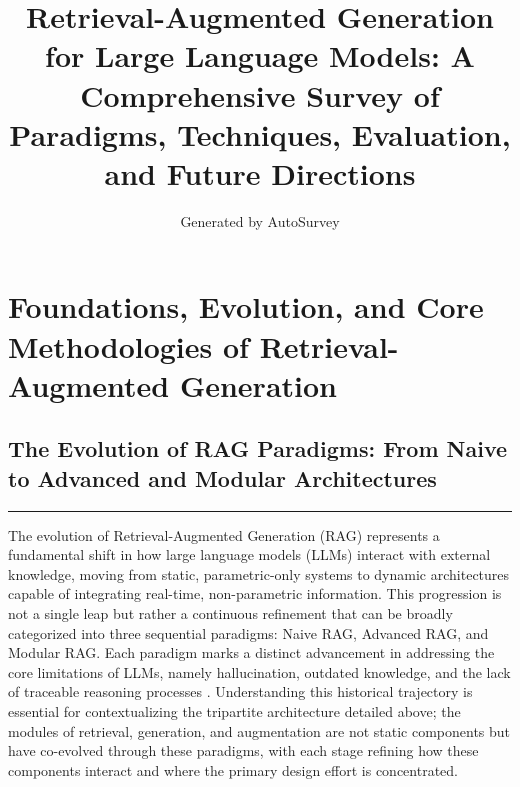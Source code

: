 \documentclass[11pt]{article}
\title{Retrieval-Augmented Generation for Large Language Models: A Comprehensive Survey of Paradigms, Techniques, Evaluation, and Future Directions}
\author{Generated by AutoSurvey}
\date{}
\begin{document}
\maketitle
\tableofcontents
\newpage

\section{Foundations, Evolution, and Core Methodologies of Retrieval-Augmented Generation}

\subsection{The Evolution of RAG Paradigms: From Naive to Advanced and Modular Architectures}

\begin{center}\rule{0.5\linewidth}{0.5pt}\end{center}

The evolution of Retrieval-Augmented Generation (RAG) represents a fundamental shift in how large language models (LLMs) interact with external knowledge, moving from static, parametric-only systems to dynamic architectures capable of integrating real-time, non-parametric information. This progression is not a single leap but rather a continuous refinement that can be broadly categorized into three sequential paradigms: Naive RAG, Advanced RAG, and Modular RAG. Each paradigm marks a distinct advancement in addressing the core limitations of LLMs, namely hallucination, outdated knowledge, and the lack of traceable reasoning processes \cite{ref1}. Understanding this historical trajectory is essential for contextualizing the tripartite architecture detailed above; the modules of retrieval, generation, and augmentation are not static components but have co-evolved through these paradigms, with each stage refining how these components interact and where the primary design effort is concentrated.
\end{document}
